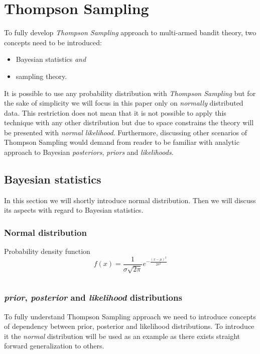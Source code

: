 \documentclass[12pt, a4paper, pdflatex]{report}
\begin{document}
\section{Thompson Sampling\label{sec:thompsonsampling}}
To fully develop \emph{Thompson Sampling} approach to multi-armed bandit theory, two concepts need to be introduced:
\begin{itemize}
\item Bayesian statistics \emph{and}
\item sampling theory.
\end{itemize}
It is possible to use any probability distribution with \emph{Thompson Sampling} but for the sake of simplicity we will focus in this paper only on \emph{normally} distributed data. This restriction does not mean that it is not possible to apply this technique with any other distribution but due to space constrains the theory will be presented with \emph{normal likelihood}. Furthermore, discussing other scenarios of Thompson Sampling would demand from reader to be familiar with analytic approach to Bayesian \emph{posteriors}, \emph{priors} and \emph{likelihoods}.

\subsection{Bayesian statistics}
In this section we will shortly introduce normal distribution. Then we will discuss its aspects with regard to Bayesian statistics.

\subsubsection{Normal distribution}

Probability density function
$$
f(x) = \frac{1}{\sigma \sqrt{2 \pi }} e^{- \frac{ {\left (  x - \mu \right )}^2 }{2 \sigma^2} }
$$

\begin{lstlisting}
\end{lstlisting}

\subsubsection{\emph{prior}, \emph{posterior} and \emph{likelihood} distributions}
To fully understand Thompson Sampling approach we need to introduce concepts of dependency between prior, posterior and likelihood distributions. To introduce it the \emph{normal} distribution will be used as an example as there exists straight forward generalization to others.\\
\end{document}

